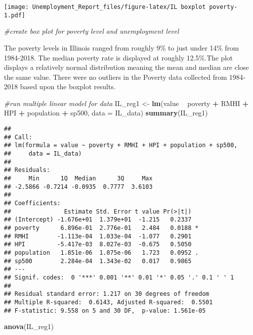 \documentclass[
]{article}
\newenvironment{Shaded}{\begin{snugshade}}{\end{snugshade}}
\newcommand{\CommentTok}[1]{\textcolor[rgb]{0.56,0.35,0.01}{\textit{#1}}}
\newcommand{\DataTypeTok}[1]{\textcolor[rgb]{0.13,0.29,0.53}{#1}}
\newcommand{\KeywordTok}[1]{\textcolor[rgb]{0.13,0.29,0.53}{\textbf{#1}}}
\newcommand{\NormalTok}[1]{#1}
\newcommand{\OperatorTok}[1]{\textcolor[rgb]{0.81,0.36,0.00}{\textbf{#1}}}
\newcommand{\StringTok}[1]{\textcolor[rgb]{0.31,0.60,0.02}{#1}}
\begin{document}
\texttt{[image: Unemployment\_Report\_files/figure-latex/IL boxplot poverty-1.pdf]}

\begin{Shaded}
\begin{Highlighting}[]
\CommentTok{#create box plot for poverty level and unemployment level}
\end{Highlighting}
\end{Shaded}

The poverty levels in Illinois ranged from roughly 9\% to just under
14\% from 1984-2018. The median poverty rate is displayed at roughly
12.5\%.The plot displays a relatively normal distribution meaning the
mean and median are close the same value. There were no outliers in the
Poverty data collected from 1984-2018 based upon the boxplot results.

\begin{Shaded}
\begin{Highlighting}[]
\CommentTok{#run multiple linear model for data}
\NormalTok{IL_reg1 <-}\StringTok{ }\KeywordTok{lm}\NormalTok{(value }\OperatorTok{~}\StringTok{ }\NormalTok{poverty }\OperatorTok{+}\StringTok{ }\NormalTok{RMHI }\OperatorTok{+}\StringTok{ }\NormalTok{HPI }\OperatorTok{+}\StringTok{ }\NormalTok{population }\OperatorTok{+}\StringTok{ }\NormalTok{sp500, }\DataTypeTok{data =}\NormalTok{ IL_data)}
\KeywordTok{summary}\NormalTok{(IL_reg1)}
\end{Highlighting}
\end{Shaded}

\begin{verbatim}
## 
## Call:
## lm(formula = value ~ poverty + RMHI + HPI + population + sp500, 
##     data = IL_data)
## 
## Residuals:
##     Min      1Q  Median      3Q     Max 
## -2.5866 -0.7214 -0.0935  0.7777  3.6103 
## 
## Coefficients:
##               Estimate Std. Error t value Pr(>|t|)  
## (Intercept) -1.676e+01  1.379e+01  -1.215   0.2337  
## poverty      6.896e-01  2.776e-01   2.484   0.0188 *
## RMHI        -1.113e-04  1.033e-04  -1.077   0.2901  
## HPI         -5.417e-03  8.027e-03  -0.675   0.5050  
## population   1.851e-06  1.075e-06   1.723   0.0952 .
## sp500        2.284e-04  1.343e-02   0.017   0.9865  
## ---
## Signif. codes:  0 '***' 0.001 '**' 0.01 '*' 0.05 '.' 0.1 ' ' 1
## 
## Residual standard error: 1.217 on 30 degrees of freedom
## Multiple R-squared:  0.6143, Adjusted R-squared:  0.5501 
## F-statistic: 9.558 on 5 and 30 DF,  p-value: 1.561e-05
\end{verbatim}

\begin{Shaded}
\begin{Highlighting}[]
\KeywordTok{anova}\NormalTok{(IL_reg1)}
\end{Highlighting}
\end{Shaded}
\end{document}
